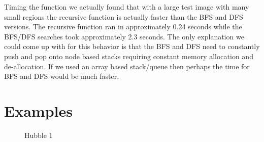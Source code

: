 \documentclass[pdftex, 11pt]{article}
\begin{document}
		Timing the function we actually found that with a large test image with many small regions the recursive
		function is actually faster than the BFS and DFS versions.  The recursive function ran in
		approximately 0.24 seconds while the BFS/DFS searches took approximately 2.3 seconds.  The only explanation we
		could come up with for this behavior is that the BFS and DFS need to constantly push and pop onto node based
		stacks requiring constant memory allocation and de-allocation.  If we used an array based stack/queue then
		perhaps the time for BFS and DFS would be much faster.

		\section{Examples}
		\begin{figure}[p]
			\centering
			\caption{Hubble 1}
		\end{figure}
\end{document}
